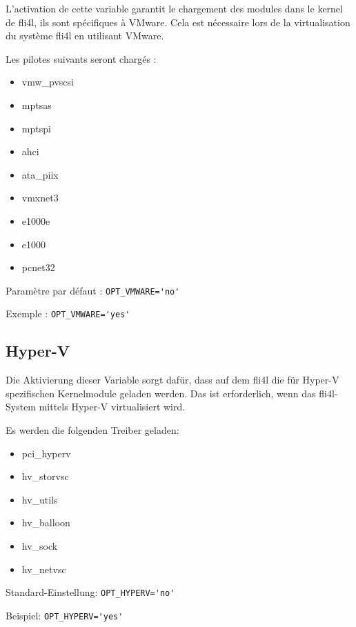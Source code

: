 \begin{description}

L'activation de cette variable garantit le chargement des modules dans
le kernel de fli4l, ils sont spécifiques à VMware. Cela est nécessaire
lors de la virtualisation du système fli4l en utilisant VMware.

Les pilotes suivants seront chargés :

\begin{itemize}
   \item vmw\_pvscsi
   \item mptsas
   \item mptspi
   \item ahci
   \item ata\_piix
   \item vmxnet3
   \item e1000e
   \item e1000
   \item pcnet32
\end{itemize}

Paramètre par défaut : \verb+OPT_VMWARE='no'+

Exemple : \verb+OPT_VMWARE='yes'+

\end{description}

\subsection {Hyper-V}

\begin{description}

Die Aktivierung dieser Variable sorgt dafür, dass auf dem fli4l die für
Hyper-V spezifischen Kernelmodule geladen werden. Das ist erforderlich,
wenn das fli4l-System mittels Hyper-V virtualisiert wird.

Es werden die folgenden Treiber geladen:

\begin{itemize}
    \item pci\_hyperv
    \item hv\_storvsc
    \item hv\_utils
    \item hv\_balloon
    \item hv\_sock
    \item hv\_netvsc
\end{itemize}

Standard-Einstellung: \verb+OPT_HYPERV='no'+

Beispiel: \verb+OPT_HYPERV='yes'+

\end{description}
